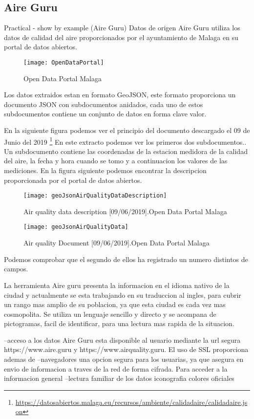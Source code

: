 \subsection{Aire Guru}
Practical - show by example (Aire Guru)
Datos de origen
Aire Guru utiliza los datos de calidad del aire proporcionados por el ayuntamiento de Malaga en su portal de datos abiertos.
\begin{figure}[h]
    \centering
    \texttt{[image: OpenDataPortal]}
    \caption{Open Data Portal Malaga}
    \end{figure}

Los datos extraidos estan en formato GeoJSON, este formato proporciona un documento JSON con subdocumentos anidados, cada uno de estos
subdocumentos contiene un conjunto de datos en forma clave valor. 

En la siguiente figura podemos ver el principio del documento descargado el 09 de Junio del 2019 
\footnote{\url{https://datosabiertos.malaga.eu/recursos/ambiente/calidadaire/calidadaire.json}}
En este extracto podemos ver los primeros dos subdocumentos.. Un subdocumento contiene las coordenadas de la estacion medidora de la calidad
del aire, la fecha y hora cuando se tomo y a continuacion los valores de las mediciones. En la figura siguiente podemos encontrar la descripcion
proporcionada por el portal de datos abiertos.
\begin{figure}[ht]
    \centering
    \texttt{[image: geoJsonAirQualityDataDescription]}
    \caption{Air quality data description [09/06/2019].Open Data Portal Malaga}
\end{figure}

\begin{figure}[ht]
    \centering
    \texttt{[image: geoJsonAirQualityData]}
    \caption{Air quality Document [09/06/2019].Open Data Portal Malaga}
    \end{figure}

    Podemos comprobar que el segundo de ellos ha registrado un numero distintos de
    campos.




    
   


La herramienta Aire guru presenta la informacion en el idioma nativo de la ciudad y actualmente se esta trabajando en su traduccion 
al ingles, para cubrir un rango mas amplio de su poblacion, ya que esta ciudad es cada vez mas cosmopolita.
Se utiliza un lenguaje sencillo y directo y se acompana de pictogramas, facil de identificar, para una
lectura mas rapida de la situacion.



--acceso a los datos
Aire Guru esta disponible al usuario mediante la url segura https://www.aire.guru y https://www.airquality.guru.
El uso de SSL proporciona ademas de 
--navegadores
una opcion segura para los usuarias, ya que asegura en envio de informacion a traves de la red de forma
cifrada.
Para acceder a la informacion general
--lectura familiar de los datos
iconografia
colores oficiales
